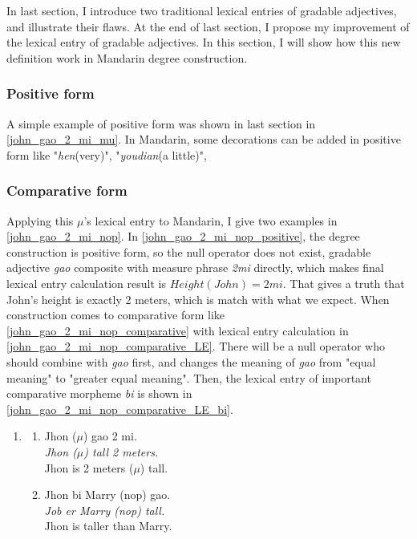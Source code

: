 \documentclass{ctexart}
\begin{document}
In last section, I introduce two traditional lexical entries of gradable adjectives, and illustrate their flaws. At the end of last section, I propose my improvement of the lexical entry of gradable adjectives. In this section, I will show how this new definition work in Mandarin degree construction.

\subsubsection{Positive form}

A simple example of positive form was shown in last section in \ref{john_gao_2_mi_mu}. In Mandarin, some decorations can be added in positive form like "\textit{hen}(very)", "\textit{youdian}(a little)", 


\subsubsection{Comparative form}


Applying this $\mu$'s lexical entry to Mandarin, I give two examples in \ref{john_gao_2_mi_nop}. In \ref{john_gao_2_mi_nop_positive}, the degree construction is positive form, so the null operator does not exist, gradable adjective \textit{gao} composite with measure phrase \textit{2mi} directly, which makes final lexical entry calculation result is $Height(John)=2mi$. That gives a truth that John's height is exactly 2 meters, which is match with what we expect. When construction comes to comparative form like \ref{john_gao_2_mi_nop_comparative} with lexical entry calculation in \ref{john_gao_2_mi_nop_comparative_LE}. There will be a null operator who should combine with \textit{gao} first, and changes the meaning of \textit{gao} from "equal meaning" to "greater equal meaning". Then, the lexical entry of important comparative morpheme \textit{bi} is shown in \ref{john_gao_2_mi_nop_comparative_LE_bi}.

\begin{enumerate}[resume]
    \item \label{john_gao_2_mi_nop}
    
    \begin{enumerate}[ref=(\arabic{enumi}\alph*)]
        \item \label{john_gao_2_mi_nop_positive}
        Jhon ($\mu$) gao 2 mi.  \\
        \textit{Jhon ($\mu$) tall 2 meters.}    \\
        Jhon is 2 meters ($\mu$) tall.

        \item \label{john_gao_2_mi_nop_comparative}
        Jhon bi Marry (nop) gao. \\  
        \textit{Job er Marry (nop) tall.}    \\
        Jhon is taller than Marry.

    \end{enumerate}
    
\end{enumerate}
\end{document}
